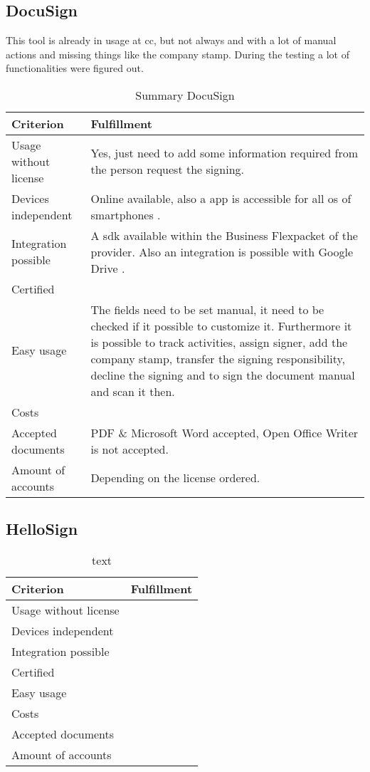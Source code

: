 \subsection{DocuSign}
This tool is already in usage at \gls{cc}, but not always and with a lot of manual actions and missing things like the company stamp. During the testing a lot of functionalities were figured out.

\begin{table}[h]
	\begin{tabular}{|p{4cm}|p{10cm}|} \hline
		Criterion & Fulfillment \\ \hline
		Usage without license & Yes, just need to add some information required from the person request the signing.\\ \hline
		Devices independent & Online available, also a \gls{app} is accessible for all \gls{os} of smartphones \parencite{docusign2018mobile}. \\ \hline
		Integration possible & A \gls{sdk} available within the \grqq Business Flex\grqq packet of the provider. Also an integration is possible with Google Drive \parencite{docusign2018integration}. \\ \hline
		Certified & \\ \hline
		Easy usage & The fields need to be set manual, it need to be checked if it possible to customize it. Furthermore it is possible to track activities, assign signer, add the company stamp, transfer the signing responsibility, decline the signing and to sign the document manual and scan it then. \\ \hline
		Costs & \\ \hline
		Accepted documents & PDF \& Microsoft Word accepted, Open Office Writer is not accepted. \\ \hline
		Amount of accounts & Depending on the license ordered.\\ \hline
	\end{tabular}
	\caption{Summary DocuSign}
	\label{tab:docusign}
\end{table}

\subsection{HelloSign}


\begin{table}[h]
	\begin{tabular}{|p{4cm}|p{10cm}|} \hline
		Criterion & Fulfillment \\ \hline
		Usage without license & \\ \hline
		Devices independent & \\ \hline
		Integration possible & \\ \hline
		Certified & \\ \hline
		Easy usage & \\ \hline
		Costs & \\ \hline
		Accepted documents & \\ \hline
		Amount of accounts & \\ \hline
	\end{tabular}
	\caption{text}
	\label{key}
\end{table}

